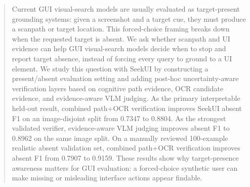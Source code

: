 \begin{abstract}
Current GUI visual-search models are usually evaluated as target-present grounding systems: given a screenshot and a target cue, they must produce a scanpath or target location. This forced-choice framing breaks down when the requested target is absent. We ask whether scanpath and UI evidence can help GUI visual-search models decide when to stop and report target absence, instead of forcing every query to ground to a UI element. We study this question with SeekUI by constructing a present/absent evaluation setting and adding post-hoc uncertainty-aware verification layers based on cognitive path evidence, OCR candidate evidence, and evidence-aware VLM judging. As the primary interpretable held-out result, combined path+OCR verification improves SeekUI absent F1 on an image-disjoint split from 0.7347 to 0.8804. As the strongest validated verifier, evidence-aware VLM judging improves absent F1 to 0.8962 on the same image split. On a manually reviewed 100-example realistic absent validation set, combined path+OCR verification improves absent F1 from 0.7907 to 0.9159. These results show why target-presence awareness matters for GUI evaluation: a forced-choice synthetic user can make missing or misleading interface actions appear findable.
\end{abstract}
